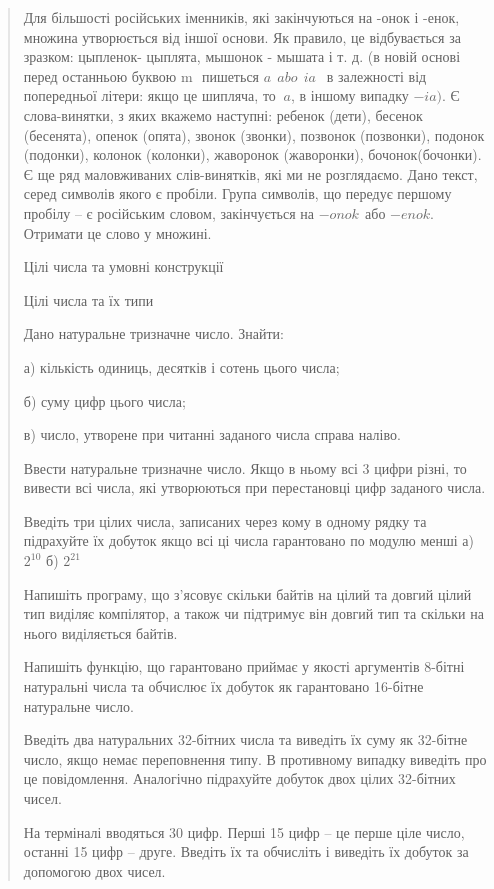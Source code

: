 \documentclass[]{article}
\begin{document}
\begin{quote}
Для більшості російських іменників, які закінчуються на -онок і -енок,
множина утворюється від іншої основи. Як правило, це відбувається за
зразком: цыпленок- цыплята, мышонок - мышата і т. д. (в новій основі
перед останньою буквою \(\text{m\ }\) пишеться \(a\ \ abo\ \ ia\ \ \) в
залежності від попередньої літери: якщо це шипляча, то \(\ a\), в іншому
випадку \(- ia)\). Є слова-винятки, з яких вкажемо наступні: ребенок
(дети), бесенок (бесенята), опенок (опята), звонок (звонки), позвонок
(позвонки), подонок (подонки), колонок (колонки), жаворонок (жаворонки),
бочонок(бочонки). Є ще ряд маловживаних слів-винятків, які ми не
розглядаємо. Дано текст, серед символів якого є пробіли. Група символів,
що передує першому пробілу -- є російським словом, закінчується на
\(- onok\ \ \)або \(- enok\). Отримати це слово у множині.

\protect\hypertarget{_Hlk63534749}{}{}Цілі числа та умовні конструкції

Цілі числа та їх типи

Дано натуральне тризначне число. Знайти:

а) кількість одиниць, десятків і сотень цього числа;

б) суму цифр цього числа;

в) число, утворене при читанні заданого числа справа наліво.

Ввести натуральне тризначне число. Якщо в ньому всі 3 цифри різні, то
вивести всі числа, які утворюються при перестановці цифр заданого числа.

Введіть три цілих числа, записаних через кому в одному рядку та
підрахуйте їх добуток якщо всі ці числа гарантовано по модулю менші а)
\(2^{10}\) б) \(2^{21}\)

Напишіть програму, що з'ясовує скільки байтів на цілий та довгий цілий
тип виділяє компілятор, а також чи підтримує він довгий тип та скільки
на нього виділяється байтів.

Напишіть функцію, що гарантовано приймає у якості аргументів 8-бітні
натуральні числа та обчислює їх добуток як гарантовано 16-бітне
натуральне число.

Введіть два натуральних 32-бітних числа та виведіть їх суму як 32-бітне
число, якщо немає переповнення типу. В противному випадку виведіть про
це повідомлення. Аналогічно підрахуйте добуток двох цілих 32-бітних
чисел.

На терміналі вводяться 30 цифр. Перші 15 цифр -- це перше ціле число,
останні 15 цифр -- друге. Введіть їх та обчисліть і виведіть їх добуток
за допомогою двох чисел.


\end{quote}
\end{document}
